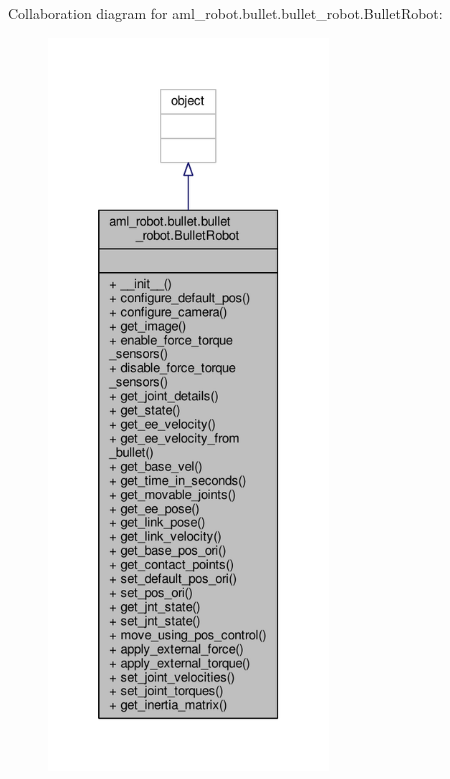 Collaboration diagram for aml\-\_\-robot.\-bullet.\-bullet\-\_\-robot.\-Bullet\-Robot\-:\nopagebreak
\begin{figure}[H]
\begin{center}
\leavevmode
\includegraphics[height=550pt]{classaml__robot_1_1bullet_1_1bullet__robot_1_1_bullet_robot__coll__graph}
\end{center}
\end{figure}
